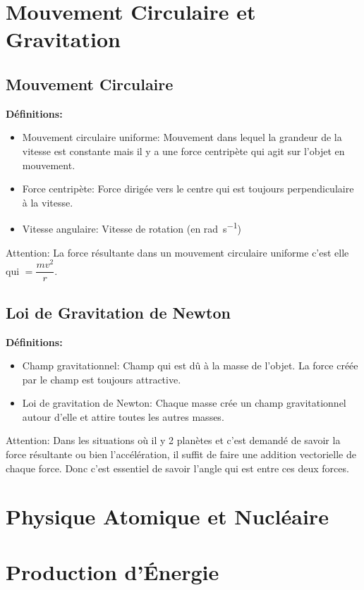 \documentclass[french, a4paper, 12pt]{article}
\begin{document}
\pagebreak

\section{Mouvement Circulaire et Gravitation}
\subsection{Mouvement Circulaire}
\textbf{Définitions:}
\begin{itemize}
\item Mouvement circulaire uniforme: Mouvement dans lequel la grandeur de la vitesse est constante mais il y a une force centripète qui agit sur l'objet en mouvement.
\item Force centripète: Force dirigée vers le centre qui est toujours perpendiculaire à la vitesse.
\item Vitesse angulaire: Vitesse de rotation (en \si{\radian\per\second})
\end{itemize}
Attention: La force résultante dans un mouvement circulaire uniforme c'est elle qui $=\dfrac{mv^2}{r}$.

\subsection{Loi de Gravitation de Newton}
\textbf{Définitions:}
\begin{itemize}
\item Champ gravitationnel: Champ qui est dû à la masse de l'objet. La force créée par le champ est toujours attractive.
\item Loi de gravitation de Newton: Chaque masse crée un champ gravitationnel autour d'elle et attire toutes les autres masses.
\end{itemize}
Attention: Dans les situations où il y 2 planètes et c'est demandé de savoir la force résultante ou bien l'accélération, il suffit de faire une addition vectorielle de chaque force. Donc c'est essentiel de savoir l'angle qui est entre ces deux forces.
\pagebreak

\section{Physique Atomique et Nucléaire}
\pagebreak

\section{Production d'Énergie}
\pagebreak
\end{document}
